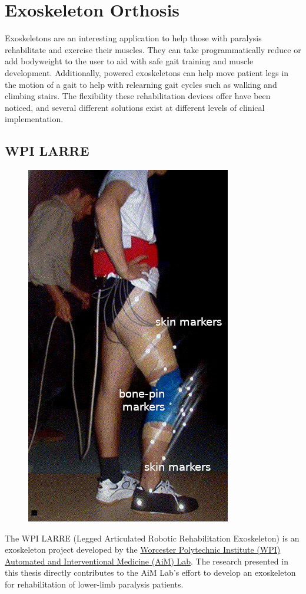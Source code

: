 

\section{Exoskeleton Orthosis}
\label{sec:OtherExos}
Exoskeletons are an interesting application to help those with paralysis rehabilitate and exercise their muscles. They can take programmatically reduce or add bodyweight to the user to aid with safe gait training and muscle development. Additionally, powered exoskeletons can help move patient legs in the motion of a gait to help with relearning gait cycles such as walking and climbing stairs. The flexibility these rehabilitation devices offer have been noticed, and several different solutions exist at different levels of clinical implementation.

\subsection{WPI LARRE}
\label{sec:larre}
\begin{figure}[ht!]
    \centering
    \includegraphics[width=0.3\linewidth]{Figures/Background/SkinMovementResearch_ImageMarked.jpg}
    \caption{}
    \label{fig:LARRE_Background}
\end{figure}

The WPI LARRE (Legged Articulated Robotic Rehabilitation Exoskeleton) is an exoskeleton project developed by the \href{http://aimlabdev.wpi.edu} {Worcester Polytechnic Institute (WPI) Automated and Interventional Medicine (AiM) Lab}. The research presented in this thesis directly contributes to the AiM Lab's effort to develop an exoskeleton for rehabilitation of lower-limb paralysis patients. 

